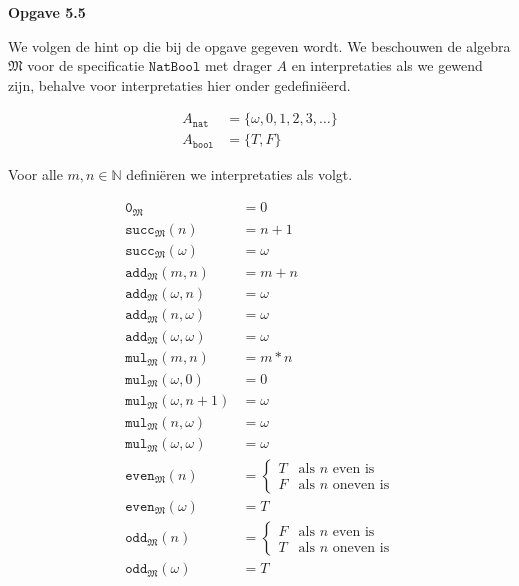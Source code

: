 \documentclass[a4paper,11pt]{article}
\begin{document}
{\bf Opgave 5.5}

We volgen de hint op die bij de opgave gegeven wordt. We beschouwen de algebra
$\mathfrak{M}$ voor de specificatie $\texttt{NatBool}$ met drager $A$ en
interpretaties als we gewend zijn, behalve voor interpretaties hier onder
gedefini\"eerd.

\begin{align*}
A_{\texttt{nat}} &= \{ \omega, 0, 1, 2, 3, \ldots \} \\
A_{\texttt{bool}} &= \{T, F\}
\end{align*}

Voor alle $m,n \in \mathbb{N}$ defini\"eren we interpretaties als volgt.

\begin{align*}
\texttt{0}_{\mathfrak{M}}                  &= 0 \\
\texttt{succ}_{\mathfrak{M}}(n)            &= n+1 \\
\texttt{succ}_{\mathfrak{M}}(\omega)       &= \omega \\
\texttt{add}_{\mathfrak{M}}(m,n)           &= m+n \\
\texttt{add}_{\mathfrak{M}}(\omega,n)      &= \omega \\
\texttt{add}_{\mathfrak{M}}(n,\omega)      &= \omega \\
\texttt{add}_{\mathfrak{M}}(\omega,\omega) &= \omega \\
\texttt{mul}_{\mathfrak{M}}(m,n)           &= m*n \\
\texttt{mul}_{\mathfrak{M}}(\omega,0)      &= 0 \\
\texttt{mul}_{\mathfrak{M}}(\omega,n+1)    &= \omega \\
\texttt{mul}_{\mathfrak{M}}(n,\omega)      &= \omega \\
\texttt{mul}_{\mathfrak{M}}(\omega,\omega) &= \omega \\
\texttt{even}_{\mathfrak{M}}(n)            &= \begin{cases}
  T & \text{als $n$ even is} \\
  F & \text{als $n$ oneven is}
\end{cases} \\
\texttt{even}_{\mathfrak{M}}(\omega)       &= T \\
\texttt{odd}_{\mathfrak{M}}(n)             &= \begin{cases}
  F & \text{als $n$ even is} \\
  T & \text{als $n$ oneven is}
\end{cases} \\
\texttt{odd}_{\mathfrak{M}}(\omega)        &= T
\end{align*}
\end{document}
